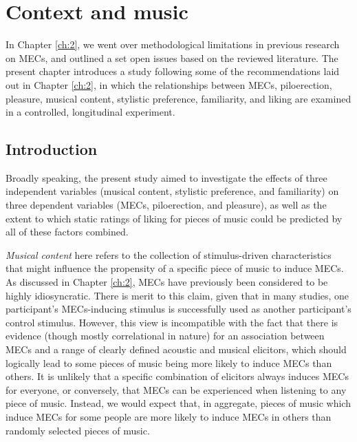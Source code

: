 
\chapter{Context and music}
\label{ch:3}

In Chapter \ref{ch:2}, we went over methodological limitations in previous research on MECs, and outlined a set open issues based on the reviewed literature. The present chapter introduces a study following some of the recommendations laid out in Chapter \ref{ch:2}, in which the relationships between MECs, piloerection, pleasure, musical content, stylistic preference, familiarity, and liking are examined in a controlled, longitudinal experiment.

\section{Introduction}

Broadly speaking, the present study aimed to investigate the effects of three independent variables (musical content, stylistic preference, and familiarity) on three dependent variables (MECs, piloerection, and pleasure), as well as the extent to which static ratings of liking for pieces of music could be predicted by all of these factors combined.

\emph{Musical content} here refers to the collection of stimulus-driven characteristics that might influence the propensity of a specific piece of music to induce MECs. As discussed in Chapter \ref{ch:2}, MECs have previously been considered to be highly idiosyncratic. There is merit to this claim, given that in many studies, one participant's MECs-inducing stimulus is successfully used as another participant's control stimulus. However, this view is incompatible with the fact that there is evidence (though mostly correlational in nature) for an association between MECs and a range of clearly defined acoustic and musical elicitors, which should logically lead to some pieces of music being more likely to induce MECs than others. It is unlikely that a specific combination of elicitors always induces MECs for everyone, or conversely, that MECs can be experienced when listening to any piece of music. Instead, we would expect that, in aggregate, pieces of music which induce MECs for some people are more likely to induce MECs in others than randomly selected pieces of music.

